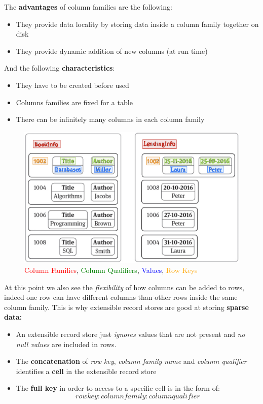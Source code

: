The \textbf{advantages} of column families are the following:
\begin{itemize}
    \item They provide data locality by storing data inside a column family together on disk
    \item They provide dynamic addition of new columns (at run time)
\end{itemize}
And the following \textbf{characteristics}:
\begin{itemize}
    \item They have to be created before used
    \item Columns families are fixed for a table
    \item There can be infinitely many columns in each column family
\end{itemize}

\begin{figure}[!hbp]
    \centering
    \includegraphics[width=0.90\linewidth]{images/AdvancedDataManagment/extensible_record_store/names_definition.jpeg}
    \caption{\textcolor{red}{Column Families}, \textcolor{green}{Column Qualifiers}, \textcolor{blue}{Values}, \textcolor{orange}{Row Keys}}
\end{figure}

At this point we also see the \textit{flexibility} of how columns can be added to rows, indeed one row can have different columns than other rows inside the same column family. This is why extensible record stores are good at storing \textbf{sparse data:} 
\begin{itemize}
    \item An extensible record store just \textit{ignores} values that are not present and \textit{no null values} are included in rows.
    \item The \textbf{concatenation} of \textit{row key}, \textit{column family name} and \textit{column qualifier} identifies a \textbf{cell} in the extensible record store
    \item The \textbf{full key} in order to access to a specific cell is in the form of:
    \[rowkey:columnfamily:columnqualifier\]
\end{itemize}

